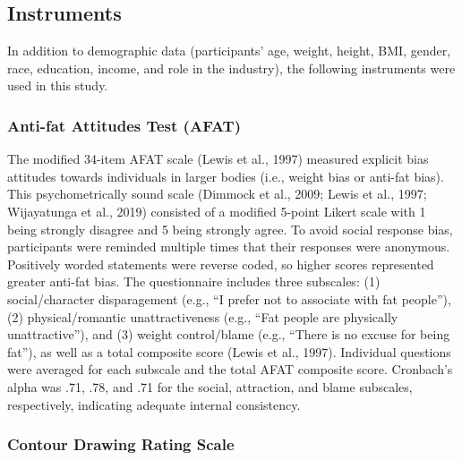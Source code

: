 \documentclass[
  jou,
  longtable,
  nolmodern,
  notxfonts,
  notimes,
  colorlinks=true,linkcolor=blue,citecolor=blue,urlcolor=blue]{apa7}
\begin{document}
\subsection{Instruments}\label{instruments}

In addition to demographic data (participants' age, weight, height, BMI,
gender, race, education, income, and role in the industry), the
following instruments were used in this study.

\subsubsection{Anti-fat Attitudes Test
(AFAT)}\label{anti-fat-attitudes-test-afat}

The modified 34-item AFAT scale (Lewis et al., 1997) measured explicit
bias attitudes towards individuals in larger bodies (i.e., weight bias
or anti-fat bias). This psychometrically sound scale (Dimmock et al.,
2009; Lewis et al., 1997; Wijayatunga et al., 2019) consisted of a
modified 5-point Likert scale with 1 being strongly disagree and 5 being
strongly agree. To avoid social response bias, participants were
reminded multiple times that their responses were anonymous. Positively
worded statements were reverse coded, so higher scores represented
greater anti-fat bias. The questionnaire includes three subscales: (1)
social/character disparagement (e.g., ``I prefer not to associate with
fat people''), (2) physical/romantic unattractiveness (e.g., ``Fat
people are physically unattractive''), and (3) weight control/blame
(e.g., ``There is no excuse for being fat''), as well as a total
composite score (Lewis et al., 1997). Individual questions were averaged
for each subscale and the total AFAT composite score. Cronbach's alpha
was .71, .78, and .71 for the social, attraction, and blame subscales,
respectively, indicating adequate internal consistency.

\subsubsection{Contour Drawing Rating
Scale}\label{contour-drawing-rating-scale}
\end{document}
